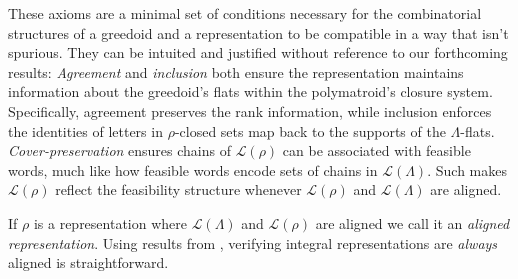 \documentclass[11pt]{article}
\newcommand{\univ}{\Sigma}
\newcommand{\glang}{\Lambda}
\providecommand{\L}{}
\renewcommand{\L}{\mathscr{L}}
\begin{document}
These axioms are a minimal set of conditions necessary for the combinatorial structures of a greedoid and a representation to be compatible in a way that isn't spurious.
They can be intuited and justified without reference to our forthcoming results:
\emph{Agreement} and \emph{inclusion} both ensure the representation maintains information about the greedoid's flats within the polymatroid's closure system.
Specifically, agreement preserves the rank information, while inclusion enforces the identities of letters in $\rho$-closed sets map back to the supports of the $\glang$-flats. 
\emph{Cover-preservation} ensures chains of $\L(\rho)$ can be associated with feasible words, much like how feasible words encode sets of chains in $\L(\glang)$.
Such makes $\L(\rho)$ reflect the feasibility structure whenever $\L(\rho)$ and $\L(\glang)$ are aligned.


If $\rho$ is a representation where $\L(\glang)$ and $\L(\rho)$ are aligned we call it an \emph{aligned representation}.
Using results from \cite{korte1985polymatroid}, verifying integral representations are \emph{always} aligned is straightforward.

\iffalse
\end{document}
